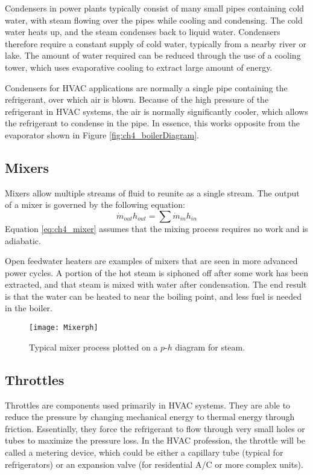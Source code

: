 Condensers in power plants typically consist of many small pipes containing cold water, with steam flowing over the pipes while cooling and condensing.  The cold water heats up, and the steam condenses back to liquid water.  Condensers therefore require a constant supply of cold water, typically from a nearby river or lake.  The amount of water required can be reduced through the use of a cooling tower, which uses evaporative cooling to extract large amount of energy.

Condensers for HVAC applications are normally a single pipe containing the refrigerant, over which air is blown.  Because of the high pressure of the refrigerant in HVAC systems, the air is normally significantly cooler, which allows the refrigerant to condense in the pipe.  In essence, this works opposite from the evaporator shown in Figure \ref{fig:ch4_boilerDiagram}.
\subsection{Mixers}  \label{sec:ch4_mixers}
Mixers allow multiple streams of fluid to reunite as a single stream.  The output of a mixer is governed by the following equation:
\begin{equation} \label{eq:ch4_mixer}
  \dot{m}_{out} h_{out} = \sum \dot{m}_{in} h_{in}
\end{equation}
Equation \ref{eq:ch4_mixer} assumes that the mixing process requires no work and is adiabatic.

Open feedwater heaters are examples of mixers that are seen in more advanced power cycles.  A portion of the hot steam is siphoned off after some work has been extracted, and that steam is mixed with water after condensation.  The end result is that the water can be heated to near the boiling point, and less fuel is needed in the boiler.


\begin{figure}[H]
\centering
\texttt{[image: Mixerph]}
\caption{Typical mixer process plotted on a $p$-$h$ diagram for steam.}
\label{fig:ch4_mixerph}
\end{figure}
\subsection{Throttles}  \label{sec:ch4_throttles}
Throttles are components used primarily in HVAC systems.  They are able to reduce the pressure by changing mechanical energy to thermal energy through friction.  Essentially, they force the refrigerant to flow through very small holes or tubes to maximize the pressure loss.  In the HVAC profession, the throttle will be called a metering device, which could be either a capillary tube (typical for refrigerators) or an expansion valve (for residential A/C or more complex units).

